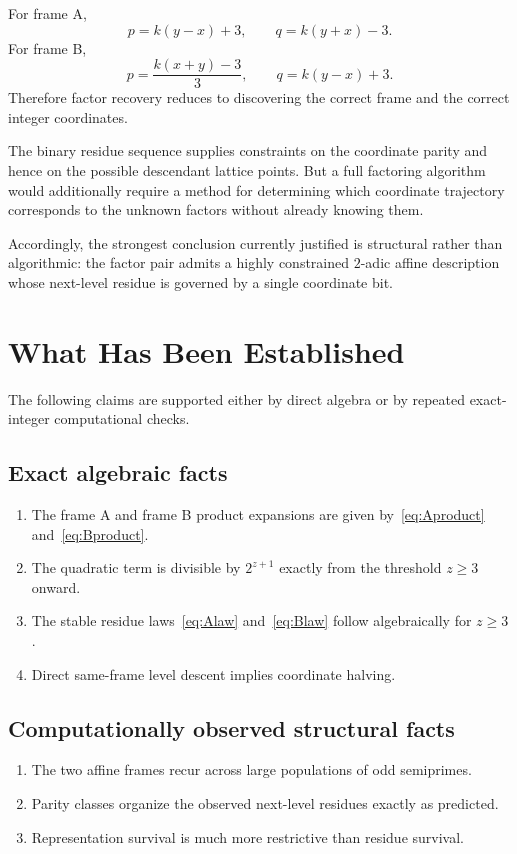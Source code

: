 \documentclass[11pt,a4paper]{article}
\theoremstyle{definition}
\theoremstyle{remark}
\begin{document}
For frame A,
\[
p=k(y-x)+3,
\qquad
q=k(y+x)-3.
\]
For frame B,
\[
p=\frac{k(x+y)-3}{3},
\qquad
q=k(y-x)+3.
\]
Therefore factor recovery reduces to discovering the correct frame and the correct integer coordinates.

The binary residue sequence supplies constraints on the coordinate parity and hence on the possible descendant lattice points. But a full factoring algorithm would additionally require a method for determining which coordinate trajectory corresponds to the unknown factors without already knowing them.

Accordingly, the strongest conclusion currently justified is structural rather than algorithmic: the factor pair admits a highly constrained $2$-adic affine description whose next-level residue is governed by a single coordinate bit.

\section{What Has Been Established}

The following claims are supported either by direct algebra or by repeated exact-integer computational checks.

\subsection{Exact algebraic facts}
\begin{enumerate}
  \item The frame A and frame B product expansions are given by~\eqref{eq:Aproduct} and~\eqref{eq:Bproduct}.
  \item The quadratic term is divisible by $2^{z+1}$ exactly from the threshold $z\ge3$ onward.
  \item The stable residue laws~\eqref{eq:Alaw} and~\eqref{eq:Blaw} follow algebraically for $z\ge3$.
  \item Direct same-frame level descent implies coordinate halving.
\end{enumerate}

\subsection{Computationally observed structural facts}
\begin{enumerate}
  \item The two affine frames recur across large populations of odd semiprimes.
  \item Parity classes organize the observed next-level residues exactly as predicted.
  \item Representation survival is much more restrictive than residue survival.
\end{enumerate}
\end{document}
